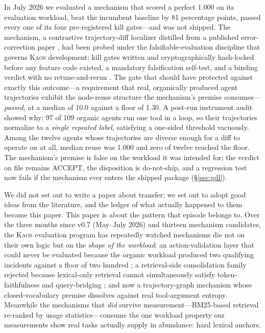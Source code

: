 \documentclass[11pt]{article}
\newcommand{\kaos}{\textsc{Kaos}}
\begin{document}
In July 2026 we evaluated a mechanism that scored a perfect 1.000 on its evaluation workload, beat the incumbent baseline by 81 percentage points, passed every one of its four pre-registered kill gates---and was not shipped. The mechanism, a contrastive trajectory-diff localizer distilled from a published error-correction paper \citep{emg2026}, had been probed under the falsifiable-evaluation discipline that governs \kaos{} development: kill gates written and cryptographically hash-locked before any feature code existed, a mandatory falsification self-test, and a binding verdict with no retune-and-rerun \citep{canivel2026plasticity}. The gate that should have protected against exactly this outcome---a requirement that real, organically produced agent trajectories exhibit the node-reuse structure the mechanism's premise consumes---\emph{passed}, at a median of 10.0 against a floor of 1.30. A post-run instrument audit showed why: 97 of 109 organic agents run one tool in a loop, so their trajectories normalize to a \emph{single repeated label}, satisfying a one-sided threshold vacuously. Among the twelve agents whose trajectories are diverse enough for a diff to operate on at all, median reuse was 1.000 and zero of twelve reached the floor. The mechanism's premise is false on the workload it was intended for; the verdict on file remains ACCEPT, the disposition is do-not-ship, and a regression test now fails if the mechanism ever enters the shipped package (\S\ref{sec:gdl}).

We did not set out to write a paper about transfer; we set out to adopt good ideas from the literature, and the ledger of what actually happened to them became this paper. This paper is about the pattern that episode belongs to. Over the three months since v0.7 (May--July 2026) and thirteen mechanism candidates, the \kaos{} evaluation program has repeatedly watched mechanisms die not on their own logic but on the \emph{shape of the workload}: an action-validation layer that could never be evaluated because the organic workload produced two qualifying incidents against a floor of two hundred \citep{lifeharness2026}; a retrieval-side consolidation family rejected because lexical-only retrieval cannot simultaneously satisfy token-faithfulness and query-bridging \citep{canivel2026plasticity}; and now a trajectory-graph mechanism whose closed-vocabulary premise dissolves against real tool-argument entropy. Meanwhile the mechanisms that \emph{did} survive measurement---BM25-based retrieval re-ranked by usage statistics---consume the one workload property our measurements show real tasks actually supply in abundance: hard lexical anchors.
\end{document}
